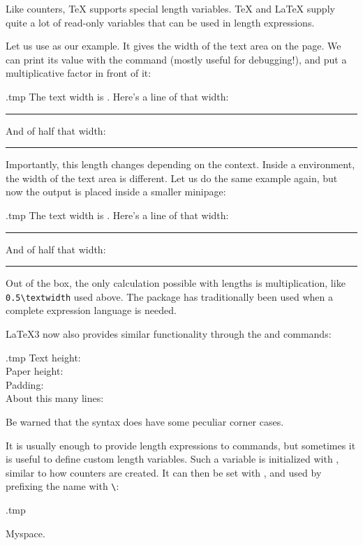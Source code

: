 Like counters, \TeX{} supports special length variables.
\TeX{} and \LaTeX{} supply quite a lot of read-only variables that can be used in length expressions.

Let us use  as our example.
It gives the width of the text area on the page.
We can print its value with the  command (mostly useful for debugging!),
and put a multiplicative factor in front of it:
%
\begin{VerbatimOut}{\jobname.tmp}
The text width is \the\textwidth.
Here's a line of that width:

{\color{blue}\rule{\textwidth}{1pt}}

And of half that width: {\color{blue}\rule{0.5\textwidth}{1pt}}
\end{VerbatimOut}
\ShowExampleBelow

Importantly, this length changes depending on the context.
Inside a  environment, the width of the text area is different.
Let us do the same example again, but now the output is placed inside a smaller minipage:
%
\begin{VerbatimOut}{\jobname.tmp}
The text width is \the\textwidth.
Here's a line of that width:

{\color{blue}\rule{\textwidth}{1pt}}

And of half that width:
{\color{blue}\rule{0.5\textwidth}{1pt}}
\end{VerbatimOut}
\ShowExample

Out of the box, the only calculation possible with lengths is multiplication,
like \verb|0.5\textwidth| used above.
The  package has traditionally been used when a complete expression language is needed.

\begin{latexthree}
\LaTeX3 now also provides similar functionality through the  and  commands:
%
\begin{VerbatimOut}{\jobname.tmp}
Text height: \the\textheight\\
Paper height: \the\paperheight\\
Padding:
\dimeval{\paperheight - \textheight}\\
About this many lines:
\inteval{\textheight / \baselineskip}
\end{VerbatimOut}
\ShowExample
%
Be warned that the syntax does have some peculiar corner cases.
\end{latexthree}


It is usually enough to provide length expressions to commands,
but sometimes it is useful to define custom length variables.
Such a variable is initialized with , similar to how counters are created.
It can then be set with , and used by prefixing the name with \verb|\|:
%
\begin{VerbatimOut}{\jobname.tmp}
\newlength\Mylen
\setlength\Mylen{1.75em}

My\hspace{\Mylen}space.
\end{VerbatimOut}
\ShowExample

